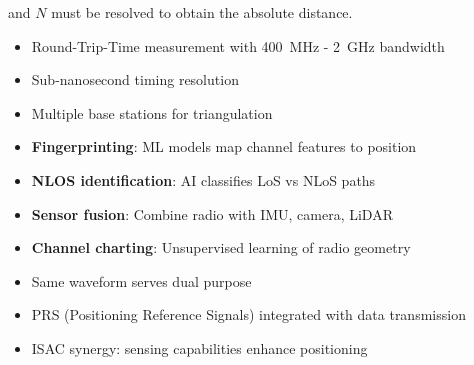
and $N$ must be resolved to obtain the absolute distance.


\begin{itemize}
\tightlist
\item
  Round-Trip-Time measurement with 400~MHz - 2~GHz bandwidth
\item
  Sub-nanosecond timing resolution
\item
  Multiple base stations for triangulation
\end{itemize}


\begin{itemize}
\tightlist
\item
  \textbf{Fingerprinting}: ML models map channel features to position
\item
  \textbf{NLOS identification}: AI classifies LoS vs NLoS paths
\item
  \textbf{Sensor fusion}: Combine radio with IMU, camera, LiDAR
\item
  \textbf{Channel charting}: Unsupervised learning of radio geometry
\end{itemize}


\begin{itemize}
\tightlist
\item
  Same waveform serves dual purpose
\item
  PRS (Positioning Reference Signals) integrated with data transmission
\item
  ISAC synergy: sensing capabilities enhance positioning
\end{itemize}



